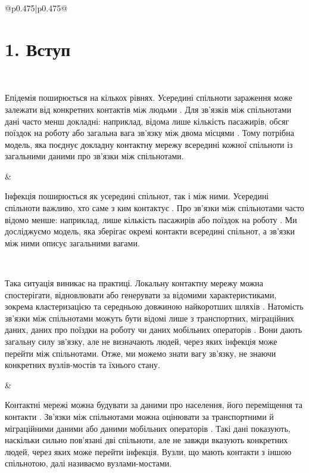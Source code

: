 ﻿\documentclass[11pt]{article}
\begin{document}
\begin{longtable}{@{}p{0.475\textwidth}|p{0.475\textwidth}@{}}
\begin{minipage}[t]{\linewidth}
\section*{1. Вступ}
\end{minipage} \\[5mm]
\begin{minipage}[t]{\linewidth}
Епідемія поширюється на кількох рівнях. Усередині спільноти зараження може залежати від конкретних контактів між людьми \citep{keeling2005,pastorsatorras2015,kiss2017}. Для зв'язків між спільнотами дані часто менш докладні: наприклад, відома лише кількість пасажирів, обсяг поїздок на роботу або загальна вага зв'язку між двома місцями \citep{balcan2009,barbosa2018human}. Тому потрібна модель, яка поєднує докладну контактну мережу всередині кожної спільноти із загальними даними про зв'язки між спільнотами.
\end{minipage} &
\begin{minipage}[t]{\linewidth}
Інфекція поширюється як усередині спільнот, так і між ними. Усередині спільноти важливо, хто саме з ким контактує \citep{keeling2005,pastorsatorras2015,kiss2017}. Про зв'язки між спільнотами часто відомо менше: наприклад, лише кількість пасажирів або поїздок на роботу \citep{balcan2009,barbosa2018human}. Ми досліджуємо модель, яка зберігає окремі контакти всередині спільнот, а зв'язки між ними описує загальними вагами.
\end{minipage} \\[5mm]
\begin{minipage}[t]{\linewidth}
Така ситуація виникає на практиці. Локальну контактну мережу можна спостерігати, відновлювати або генерувати за відомими характеристиками, зокрема кластеризацією та середньою довжиною найкоротших шляхів \citep{eubank2004,danon2011}. Натомість зв'язки між спільнотами можуть бути відомі лише з транспортних, міграційних даних, даних про поїздки на роботу чи даних мобільних операторів \citep{barbosa2018human,chang2021}. Вони дають загальну силу зв'язку, але не визначають людей, через яких інфекція може перейти між спільнотами. Отже, ми можемо знати вагу зв'язку, не знаючи конкретних вузлів-мостів та їхнього стану.
\end{minipage} &
\begin{minipage}[t]{\linewidth}
Контактні мережі можна будувати за даними про населення, його переміщення та контакти \citep{eubank2004,danon2011}. Зв'язки між спільнотами можна оцінювати за транспортними й міграційними даними або даними мобільних операторів \citep{barbosa2018human,chang2021}. Такі дані показують, наскільки сильно пов'язані дві спільноти, але не завжди вказують конкретних людей, через яких може перейти інфекція. Вузли, що мають контакти з іншою спільнотою, далі називаємо вузлами-мостами.

\end{minipage}
\end{longtable}
\end{document}
